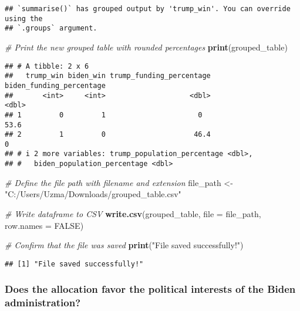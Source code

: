 \documentclass[
]{article}
\newenvironment{Shaded}{\begin{snugshade}}{\end{snugshade}}
\newcommand{\AttributeTok}[1]{\textcolor[rgb]{0.13,0.29,0.53}{#1}}
\newcommand{\CommentTok}[1]{\textcolor[rgb]{0.56,0.35,0.01}{\textit{#1}}}
\newcommand{\ConstantTok}[1]{\textcolor[rgb]{0.56,0.35,0.01}{#1}}
\newcommand{\FunctionTok}[1]{\textcolor[rgb]{0.13,0.29,0.53}{\textbf{#1}}}
\newcommand{\NormalTok}[1]{#1}
\newcommand{\OtherTok}[1]{\textcolor[rgb]{0.56,0.35,0.01}{#1}}
\newcommand{\StringTok}[1]{\textcolor[rgb]{0.31,0.60,0.02}{#1}}
\begin{document}
\begin{verbatim}
## `summarise()` has grouped output by 'trump_win'. You can override using the
## `.groups` argument.
\end{verbatim}

\begin{Shaded}
\begin{Highlighting}[]
\CommentTok{\# Print the new grouped table with rounded percentages}
\FunctionTok{print}\NormalTok{(grouped\_table)}
\end{Highlighting}
\end{Shaded}

\begin{verbatim}
## # A tibble: 2 x 6
##   trump_win biden_win trump_funding_percentage biden_funding_percentage
##       <int>     <int>                    <dbl>                    <dbl>
## 1         0         1                      0                       53.6
## 2         1         0                     46.4                      0  
## # i 2 more variables: trump_population_percentage <dbl>,
## #   biden_population_percentage <dbl>
\end{verbatim}

\begin{Shaded}
\begin{Highlighting}[]
\CommentTok{\# Define the file path with filename and extension}
\NormalTok{file\_path }\OtherTok{\textless{}{-}} \StringTok{"C:/Users/Uzma/Downloads/grouped\_table.csv"}

\CommentTok{\# Write dataframe to CSV}
\FunctionTok{write.csv}\NormalTok{(grouped\_table, }\AttributeTok{file =}\NormalTok{ file\_path, }\AttributeTok{row.names =} \ConstantTok{FALSE}\NormalTok{)}

\CommentTok{\# Confirm that the file was saved}
\FunctionTok{print}\NormalTok{(}\StringTok{"File saved successfully!"}\NormalTok{)}
\end{Highlighting}
\end{Shaded}

\begin{verbatim}
## [1] "File saved successfully!"
\end{verbatim}

\subsubsection{Does the allocation favor the political interests of the
Biden
administration?}\label{does-the-allocation-favor-the-political-interests-of-the-biden-administration}
\end{document}
